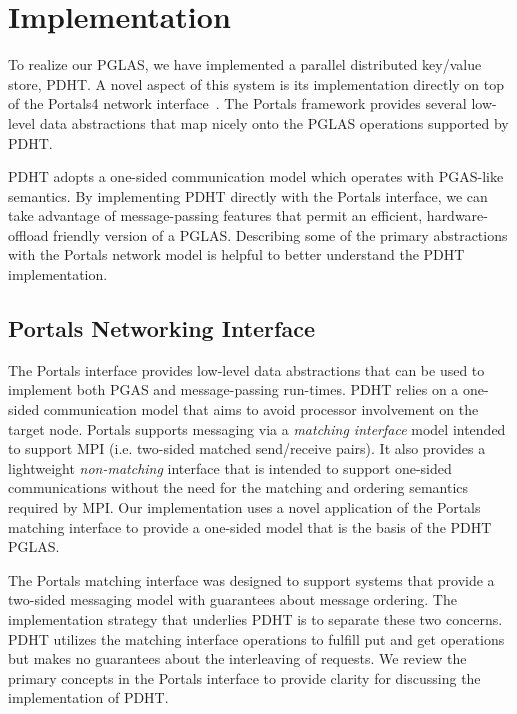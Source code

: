 \section{Implementation}

To realize our PGLAS, we have implemented a parallel distributed key/value store, 
PDHT. A novel aspect of this system is its implementation directly on top of the
Portals4 network interface~\cite{portals4}. The Portals framework provides several low-level 
data abstractions that map nicely onto the PGLAS operations supported by PDHT.

PDHT adopts a one-sided communication model which operates with PGAS-like
semantics. By implementing PDHT directly with the Portals interface, we can
take advantage of message-passing features that permit an efficient,
hardware-offload friendly version of a PGLAS. Describing
some of the primary abstractions with the Portals network model is helpful 
to better understand the PDHT implementation.

\subsection{Portals Networking Interface}


The Portals interface provides low-level data abstractions that can be used to
implement both PGAS and message-passing run-times. PDHT relies on a one-sided
communication model that aims to avoid processor involvement on the target
node. Portals supports messaging via a {\em matching interface} model intended to
support MPI (i.e. two-sided matched send/receive pairs). It also provides a
lightweight {\em non-matching} interface that is intended to support one-sided
communications without the need for the matching and ordering semantics
required by MPI. Our implementation uses a novel application of the Portals
matching interface to provide a one-sided model that is the basis of the PDHT
PGLAS. 

The Portals matching interface was designed to support systems that provide a
two-sided messaging model with guarantees about message ordering. The
implementation strategy that underlies PDHT is to separate these two concerns.
PDHT utilizes the matching interface operations to fulfill put and get
operations but makes no guarantees about the interleaving of requests. We
review the primary concepts in the Portals interface to provide clarity for
discussing the implementation of PDHT.


